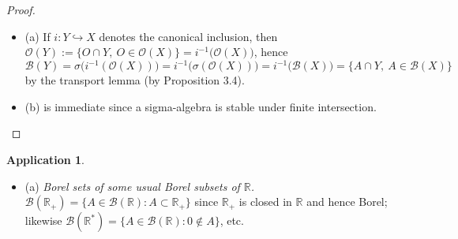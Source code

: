 \documentclass[11pt]{article}
\theoremstyle{definition}
\newtheorem{application}{Application}[section]
\begin{document}
\begin{proof}
\begin{itemize}
\item (a) If $i:Y\hookrightarrow X$ denotes the canonical inclusion, then $\mathcal O(Y):=\{O\cap Y,\ O\in\mathcal O(X)\}=i^{-1}\bigl(\mathcal O(X)\bigr)$, hence
\[
\mathcal B(Y)=\sigma\bigl(i^{-1}(\mathcal O(X))\bigr)=i^{-1}\bigl(\sigma(\mathcal O(X))\bigr)=i^{-1}\bigl(\mathcal B(X)\bigr)=\{A\cap Y,\ A\in\mathcal B(X)\}
\]
by the transport lemma (by Proposition 3.4).
\quad

\item (b) is immediate since a sigma-algebra is stable under finite intersection.
\end{itemize}
\end{proof}

\begin{application}
\begin{itemize}
\item (a) \emph{Borel sets of some usual Borel subsets of $\mathbb R$.}
$\mathcal B(\mathbb R_+)=\{A\in\mathcal B(\mathbb R): A\subset \mathbb R_+\}$ since $\mathbb R_+$ is closed in $\mathbb R$ and hence Borel; likewise $\mathcal B(\mathbb R^\ast)=\{A\in\mathcal B(\mathbb R): 0\notin A\}$, etc.


\end{itemize}
\end{application}
\end{document}
